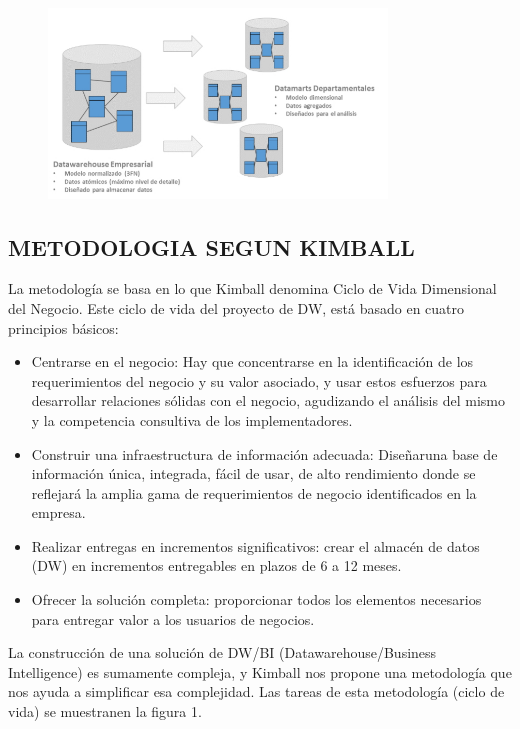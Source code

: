 \documentclass[%
 reprint,
 amsmath,amssymb,
 aps,
]{revtex4-1}
\begin{document}
			\begin{figure}[htb]
				\begin{center}
					\includegraphics[width=9cm]{./IMAGENES/imgleydi3}
				\end{center}
			\end{figure}
\subsection{METODOLOGIA SEGUN KIMBALL}	
La metodología se basa en lo que Kimball denomina Ciclo de Vida Dimensional del Negocio. Este ciclo de vida del proyecto de DW, está basado en cuatro principios básicos: 

\begin{itemize}
	\item Centrarse en el negocio: Hay que concentrarse en la identificación de los requerimientos del negocio y su valor asociado, y usar estos esfuerzos para desarrollar relaciones sólidas con el negocio, agudizando el análisis del mismo y la competencia consultiva de los implementadores. 
	\item Construir una infraestructura de información adecuada: Diseñaruna base de información única, integrada, fácil de usar, de alto rendimiento donde se reflejará la amplia gama de requerimientos de negocio identificados en la empresa. 
	\item Realizar entregas en incrementos significativos: crear el almacén de datos (DW) en incrementos entregables en plazos de 6 a 12 meses.
	\item Ofrecer la solución completa: proporcionar todos los elementos necesarios para entregar valor a los usuarios de negocios. 
\end{itemize}

La construcción de una solución de DW/BI (Datawarehouse/Business Intelligence) es sumamente compleja, y Kimball nos propone una metodología que nos ayuda a simplificar esa complejidad. Las tareas de esta metodología (ciclo de vida) se muestranen la figura 1.
\end{document}
